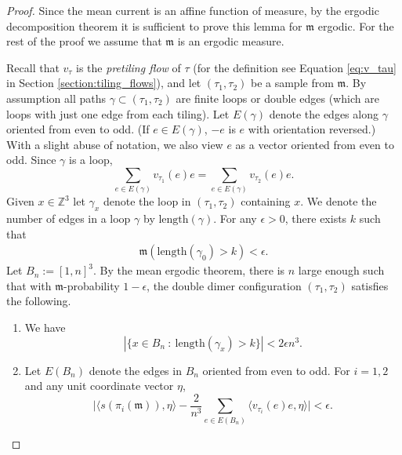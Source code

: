 \documentclass[11pt]{article}
\theoremstyle{remark}
\theoremstyle{definition}
\newcommand{\Z}{\mathbb{Z}}
\begin{document}
\begin{proof}
Since the mean current is an affine function of measure, by the ergodic decomposition theorem it is sufficient to prove this lemma for $\mathfrak m$ ergodic. For the rest of the proof we assume that $\mathfrak m$ is an ergodic measure. 

Recall that $v_\tau$ is the \textit{pretiling flow} of $\tau$ (for the definition see Equation \eqref{eq:v_tau} in Section \ref{section:tiling_flows}), and let $(\tau_1,\tau_2)$ be a sample from $\mathfrak m$. By assumption all paths $\gamma\subset (\tau_1,\tau_2)$ are finite loops or double edges (which are loops with just one edge from each tiling). Let $E(\gamma)$ denote the edges along $\gamma$ oriented from even to odd. (If $e\in E(\gamma)$, $-e$ is $e$ with orientation reversed.) With a slight abuse of notation, we also view $e$ as a vector oriented from even to odd. Since $\gamma$ is a loop,
\begin{equation}\label{eq: shift equal''}
     \sum_{e\in E(\gamma)} v_{\tau_1}(e) { e} = \sum_{e\in E(\gamma)} v_{\tau_2}(e) {e}.
\end{equation}
Given $x\in \Z^3$ let $\gamma_x$ denote the loop in $(\tau_1,\tau_2)$ containing $x$. We denote the number of edges in a loop $\gamma$ by $\text{length}(\gamma)$.  For any $\epsilon>0$, there exists $k$ such that 
\begin{align*}
    \mathfrak m(\text{length}(\gamma_0) >k ) < \epsilon.
\end{align*}
Let $B_n:=[1,n]^3$. By the mean ergodic theorem, there is $n$ large enough such that with $\mathfrak m$-probability $1-\epsilon$, the double dimer configuration $(\tau_1,\tau_2)$ satisfies the following.
\begin{enumerate}
    \item We have
    \begin{equation}\label{eq: points on long paths''}
        |\{ x\in B_n~:~\text{length}(\gamma_x) > k \}| < 2\epsilon n^3.
    \end{equation}
    \item Let $E(B_n)$ denote the edges in $B_n$ oriented from even to odd. For $i=1,2$ and any unit coordinate vector $\eta$, 
    \begin{equation}\label{eq: mean current approx i12''}
        \bigg\lvert \langle s(\pi_i(\mathfrak m)),\eta\rangle - \frac{2}{n^3} \sum_{e\in E(B_n)} \langle v_{\tau_i}(e) e, \eta\rangle \bigg\rvert < \epsilon.
    \end{equation}
\end{enumerate}

\end{proof}
\end{document}
